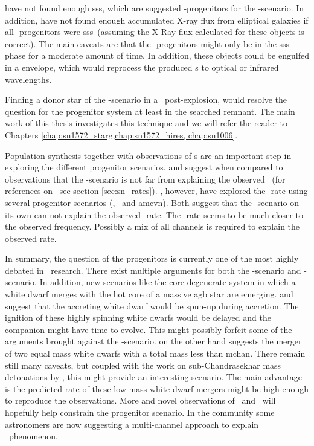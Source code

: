 \cite{2010ApJ...719..474D} have not found enough \gls{sss}, which are suggested \snia-progenitors for the \sd-scenario. In addition, \cite{2010Natur.463..924G} have not found enough accumulated X-ray flux from elliptical galaxies if all \snia-progenitors were \gls{sss}\ (assuming the X-Ray flux calculated for these objects is correct). The main caveats are that the \snia-progenitors might only be in the \gls{sss}-phase for a moderate amount of time. In addition, these objects could be engulfed in a envelope, which would reprocess the produced \xray s to optical or infrared wavelengths.

Finding a donor star of the \sd-scenario in a \snr\ post-explosion, would resolve the question for the progenitor system at least in the searched remnant. The main work of this thesis investigates this technique and we will refer the reader to Chapters \ref{chap:sn1572_starg,chap:sn1572_hires, chap:sn1006}. 

Population synthesis together with observations of \dtd s are an important step in exploring the different progenitor scenarios. \citet{2008ApJ...683L.127H, Han:2004p444}  and suggest when compared to observations that the \sd-scenario is not far from explaining the observed \dtd\ (for references on \dtd\ see section \ref{sec:sn_rates}). 
\citet{2009ApJ...699.2026R, 2010A&A...515A..89M}, however, have explored the \snia-rate using several progenitor scenarios (\sd, \dd\ and \gls{amcvn}). Both suggest that the \sd-scenario on its own can not explain the observed \sneia-rate. The \dd-rate seems to be much closer to the observed frequency. Possibly a mix of all channels is required to explain the observed rate. 

In summary, the question of the progenitors is currently one of the most highly debated in \sneia\ research. There exist multiple arguments for both the \sd-scenario and \dd-scenario. In addition, new scenarios like the core-degenerate system in which a white dwarf merges with the hot core of a massive \gls{agb} star \cite{2011arXiv1106.2027I} are emerging. \cite{2011arXiv1102.4342D} and \citet{2011ApJ...730L..34J} suggest that the accreting white dwarf would be spun-up during accretion. The ignition of these highly spinning white dwarfs would be delayed and the companion might have time to evolve. This might possibly forfeit some of the arguments brought against the \sd-scenario. 
\cite{2010ApJ...722L.157V} on the other hand suggests the merger of two equal mass white dwarfs with a total mass less than \gls{mchan}. There remain still many caveats, but coupled with the work on sub-Chandrasekhar mass detonations by \citet{2010ApJ...714L..52S}, this might provide an interesting scenario. The main advantage is the predicted rate of these low-mass white dwarf mergers might be high enough to reproduce the observations.
More and novel observations of \sneia\ and \snr\ will hopefully help constrain the progenitor scenario. In the community some astronomers are now suggesting a multi-channel approach to explain \sneia\ phenomenon.
 


